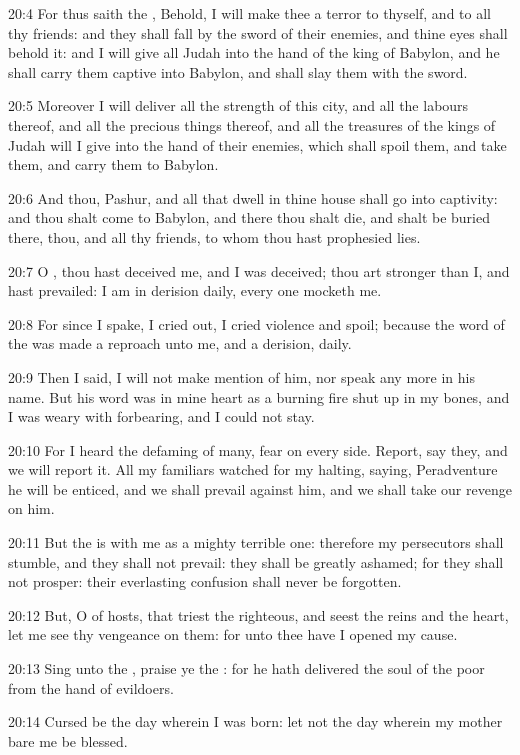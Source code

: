 20:4 For thus saith the \LORD, Behold, I will make thee a terror to thyself, and to all thy friends: and they shall fall by the sword of their enemies, and thine eyes shall behold it: and I will give all Judah into the hand of the king of Babylon, and he shall carry them captive into Babylon, and shall slay them with the sword.

20:5 Moreover I will deliver all the strength of this city, and all the labours thereof, and all the precious things thereof, and all the treasures of the kings of Judah will I give into the hand of their enemies, which shall spoil them, and take them, and carry them to Babylon.

20:6 And thou, Pashur, and all that dwell in thine house shall go into captivity: and thou shalt come to Babylon, and there thou shalt die, and shalt be buried there, thou, and all thy friends, to whom thou hast prophesied lies.

20:7 O \LORD, thou hast deceived me, and I was deceived; thou art stronger than I, and hast prevailed: I am in derision daily, every one mocketh me.

20:8 For since I spake, I cried out, I cried violence and spoil; because the word of the \LORD was made a reproach unto me, and a derision, daily.

20:9 Then I said, I will not make mention of him, nor speak any more in his name. But his word was in mine heart as a burning fire shut up in my bones, and I was weary with forbearing, and I could not stay.

20:10 For I heard the defaming of many, fear on every side. Report, say they, and we will report it. All my familiars watched for my halting, saying, Peradventure he will be enticed, and we shall prevail against him, and we shall take our revenge on him.

20:11 But the \LORD is with me as a mighty terrible one: therefore my persecutors shall stumble, and they shall not prevail: they shall be greatly ashamed; for they shall not prosper: their everlasting confusion shall never be forgotten.

20:12 But, O \LORD of hosts, that triest the righteous, and seest the reins and the heart, let me see thy vengeance on them: for unto thee have I opened my cause.

20:13 Sing unto the \LORD, praise ye the \LORD: for he hath delivered the soul of the poor from the hand of evildoers.

20:14 Cursed be the day wherein I was born: let not the day wherein my mother bare me be blessed.

